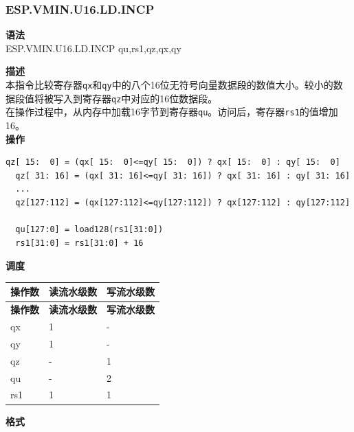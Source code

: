 \newpage
\subsubsection{ESP.VMIN.U16.LD.INCP}\label{instruction:ESPVMINU16LDINCP}
\textbf{语法}\\
ESP.VMIN.U16.LD.INCP qu,rs1,qz,qx,qy

\textbf{描述}\\
本指令比较寄存器\lstinline{qx}和\lstinline{qy}中的八个16位无符号向量数据段的数值大小。较小的数据段值将被写入到寄存器\lstinline{qz}中对应的16位数据段。\\在操作过程中，从内存中加载16字节到寄存器\lstinline{qu}。访问后，寄存器\lstinline{rs1}的值增加16。\\
\textbf{操作}
\begin{lstlisting}[escapeinside=`?]
  qz[ 15:  0] = (qx[ 15:  0]<=qy[ 15:  0]) ? qx[ 15:  0] : qy[ 15:  0]
  qz[ 31: 16] = (qx[ 31: 16]<=qy[ 31: 16]) ? qx[ 31: 16] : qy[ 31: 16]
  ...
  qz[127:112] = (qx[127:112]<=qy[127:112]) ? qx[127:112] : qy[127:112]

  qu[127:0] = load128(rs1[31:0])
  rs1[31:0] = rs1[31:0] + 16
\end{lstlisting}


\textbf{调度}\\
\begin{longtable}[c]{|l|l|l|}
    \hline
    \rowcolor{lightgray}
    \textbf{操作数} & \textbf{读流水级数} & \textbf{写流水级数} \\\hline
    \endfirsthead
    \hline
    \rowcolor{lightgray}
     \textbf{操作数} & \textbf{读流水级数} & \textbf{写流水级数} \\\hline
    \endhead
    \hline
    \endfoot

    qx & 1 & - \\\hline
  qy & 1 & - \\\hline
     qz & - & 1 \\\hline
     qu & - & 2 \\\hline
     rs1 & 1 & 1

\end{longtable}

\textbf{格式}\\

